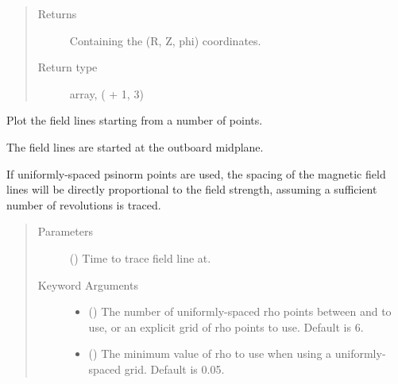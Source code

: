 \documentclass[letterpaper,10pt,english]{sphinxmanual}
\begin{document}
\begin{fulllineitems}
\begin{fulllineitems}
\begin{quote}
\begin{description}
\item[{Returns}] \leavevmode
Containing the (R, Z, phi) coordinates.

\item[{Return type}] \leavevmode
array, ( + 1, 3)

\end{description}\end{quote}

\end{fulllineitems}


\begin{fulllineitems}
\label{\detokenize{eqtools:eqtools.core.Equilibrium.plotField}}
Plot the field lines starting from a number of points.

The field lines are started at the outboard midplane.

If uniformly-spaced psinorm points are used, the spacing of the magnetic
field lines will be directly proportional to the field strength,
assuming a sufficient number of revolutions is traced.
\begin{quote}\begin{description}
\item[{Parameters}] \leavevmode
{} () \textendash{} Time to trace field line at.

\item[{Keyword Arguments}] \leavevmode\begin{itemize}
\item {} 
 () \textendash{} The number of uniformly-spaced rho
points between  and  to use, or an explicit grid of rho
points to use. Default is 6.

\item {} 
 () \textendash{} The minimum value of rho to use when using a
uniformly-spaced grid. Default is 0.05.


\end{itemize}
\end{description}
\end{quote}
\end{fulllineitems}
\end{fulllineitems}
\end{document}
